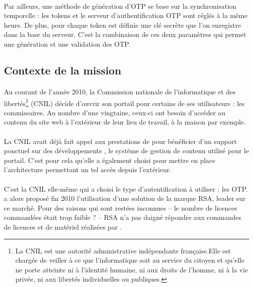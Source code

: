 \paragraph{}
Par ailleurs, une méthode de génération d'OTP se base sur la synchronisation temporelle : les tokens et le serveur d'authentification OTP sont réglés à la même heure.
De plus, pour chaque token est définie une clé secrète que l'on enregistre dans la base du serveur.
C'est la combinaison de ces deux paramètres qui permet une génération et une validation des OTP.


\subsection{Contexte de la mission}

\paragraph{}
Au courant de l'année 2010, la Commission nationale de l'informatique et des libertés\footnote{La CNIL est une autorité administrative indépendante française.Elle est chargée de veiller à ce que l'informatique soit au service du citoyen et qu'elle ne porte atteinte ni à l'identité humaine, ni aux droits de l'homme, ni à la vie privée, ni aux libertés individuelles ou publiques.\cite{cnil}} (CNIL) décide d'ouvrir son portail \aintranet{} pour certains de ses utilisateurs : les commissaires.
Au nombre d'une vingtaine, ceux-ci ont besoin d'accéder au contenu du site web à l'extérieur de leur lieu de travail, à la maison par exemple.

\paragraph{}
La CNIL avait déjà fait appel aux prestations de \asmile{} pour bénéficier d'un support ponctuel sur des développements \atypo{}, le système de gestion de contenu utilisé pour le portail.
C'est pour cela qu'elle a également choisi \asmile{} pour mettre en place l'architecture permettant un tel accès depuis l'extérieur.

\paragraph{}
C'est la CNIL elle-même qui a choisi le type d'autentification à utiliser : les OTP.
\asmile{} a alors proposé fin 2010 l'utilisation d'une solution de la marque RSA, leader sur ce marché.
Pour des raisons qui sont restées inconnues -- le nombre de licences commandées était trop faible ? -- RSA n'a pas daigné répondre aux commandes de licences et de matériel réalisées par \asmile.

